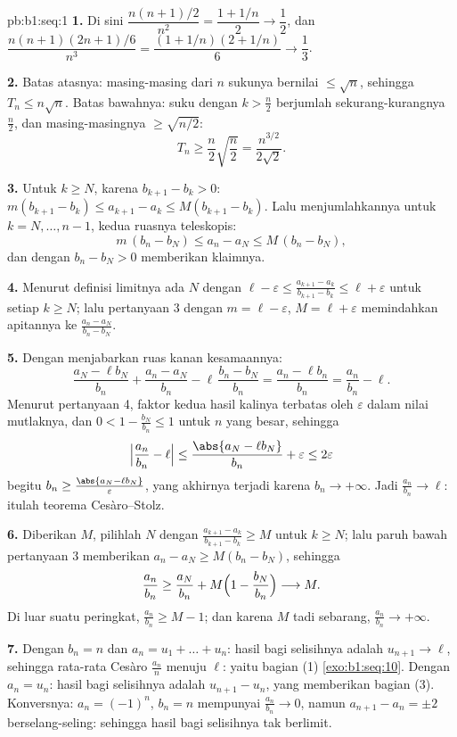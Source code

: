 \begin{solution}{pb:b1:seq:1}
\textbf{1.} Di sini $\dfrac{n(n+1)/2}{n^2} = \dfrac{1 + 1/n}{2} \to
\dfrac12$, dan $\dfrac{n(n+1)(2n+1)/6}{n^3} = \dfrac{(1 +
1/n)(2 + 1/n)}{6} \to \dfrac13$.

\textbf{2.} Batas atasnya: masing-masing dari $n$ sukunya bernilai $\leq \sqrt n$, sehingga
$T_n \leq n\sqrt n$. Batas bawahnya: suku dengan $k > \frac n2$ berjumlah
sekurang-kurangnya $\frac n2$, dan masing-masingnya $\geq \sqrt{n/2}$:
\[
T_n \geq \frac n2 \sqrt{\frac n2} = \frac{n^{3/2}}{2\sqrt 2} .
\]

\textbf{3.} Untuk $k \geq N$, karena $b_{k+1} - b_k > 0$:
$m(b_{k+1} - b_k) \leq a_{k+1} - a_k \leq M(b_{k+1} - b_k)$.
Lalu menjumlahkannya untuk $k = N, \dots, n - 1$, kedua ruasnya teleskopis:
\[
m\,(b_n - b_N) \leq a_n - a_N \leq M\,(b_n - b_N),
\]
dan  dengan $b_n - b_N > 0$ memberikan klaimnya.

\textbf{4.} Menurut definisi limitnya ada $N$ dengan $\ell -
\varepsilon \leq \frac{a_{k+1} - a_k}{b_{k+1} - b_k} \leq \ell +
\varepsilon$ untuk setiap $k \geq N$; lalu pertanyaan 3 dengan $m = \ell -
\varepsilon$, $M = \ell + \varepsilon$ memindahkan apitannya
ke $\frac{a_n - a_N}{b_n - b_N}$.

\textbf{5.} Dengan menjabarkan ruas kanan kesamaannya:
\[
\frac{a_N - \ell b_N}{b_n} + \frac{a_n - a_N}{b_n} -
\ell\,\frac{b_n - b_N}{b_n}
= \frac{a_n - \ell b_n}{b_n} = \frac{a_n}{b_n} - \ell .
\]
Menurut pertanyaan 4, faktor kedua hasil kalinya terbatas oleh
$\varepsilon$ dalam nilai mutlaknya, dan $0 < 1 - \frac{b_N}{b_n}
\leq 1$ untuk $n$ yang besar, sehingga
\[
\Bigl|\frac{a_n}{b_n} - \ell\Bigr|
\leq \frac{\abs{a_N - \ell b_N}}{b_n} + \varepsilon
\leq 2\varepsilon
\]
begitu $b_n \geq \frac{\abs{a_N - \ell b_N}}{\varepsilon}$,
yang akhirnya terjadi karena $b_n \to +\infty$. Jadi
$\frac{a_n}{b_n} \to \ell$: itulah teorema Cesàro--Stolz.

\textbf{6.} Diberikan $M$, pilihlah $N$ dengan $\frac{a_{k+1} -
a_k}{b_{k+1} - b_k} \geq M$ untuk $k \geq N$; lalu paruh bawah
pertanyaan 3 memberikan $a_n - a_N \geq M(b_n - b_N)$, sehingga
\[
\frac{a_n}{b_n} \geq \frac{a_N}{b_n} +
M\Bigl(1 - \frac{b_N}{b_n}\Bigr) \longrightarrow M .
\]
Di luar suatu peringkat, $\frac{a_n}{b_n} \geq M - 1$; dan karena $M$ tadi
sebarang, $\frac{a_n}{b_n} \to +\infty$.

\textbf{7.} Dengan $b_n = n$ dan $a_n = u_1 + \dots + u_n$: hasil bagi
selisihnya adalah $u_{n+1} \to \ell$, sehingga rata-rata Cesàro
$\frac{a_n}{n}$ menuju $\ell$: yaitu bagian (1)
\cref{exo:b1:seq:10}. Dengan $a_n = u_n$: hasil bagi selisihnya
adalah $u_{n+1} - u_n$, yang memberikan bagian (3). Konversnya: $a_n = (-1)^n$,
$b_n = n$ mempunyai $\frac{a_n}{b_n} \to 0$, namun $a_{n+1} - a_n = \pm
2$ berselang-seling: sehingga hasil bagi selisihnya tak berlimit.


\end{solution}
